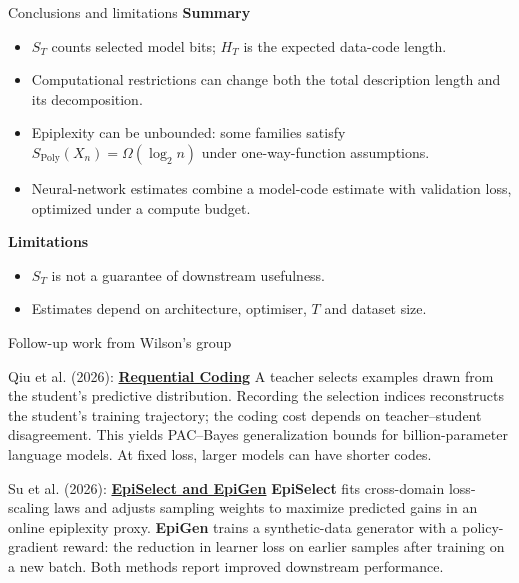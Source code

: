 \documentclass[aspectratio=169,notheorems]{beamer}
\theoremstyle{definition}
\newcommand{\Poly}{\mathrm{Poly}}
\begin{document}
\begin{frame}{Conclusions and limitations}
\textbf{Summary}
\begin{itemize}\setlength{\itemsep}{0.3em}
\item $S_T$ counts selected model bits; $H_T$ is the expected data-code length.
\item Computational restrictions can change both the total description length and its decomposition.
\item Epiplexity can be unbounded: some families satisfy $S_{\Poly}(X_n)=\Omega(\log_2 n)$ under one-way-function assumptions.
\item Neural-network estimates combine a model-code estimate with validation loss, optimized under a compute budget.
\end{itemize}
\medskip
\textbf{Limitations}
\begin{itemize}\setlength{\itemsep}{0.3em}
\item $S_T$ is not a guarantee of downstream usefulness.
\item Estimates depend on architecture, optimiser, $T$ and dataset size.
\end{itemize}
\end{frame}
\begin{frame}{Follow-up work from Wilson's group}
\small
\begin{block}{Qiu et al. (2026): \href{https://arxiv.org/abs/2607.11883}{\textbf{Requential Coding}}}
A teacher selects examples drawn from the student's predictive distribution. Recording the selection indices reconstructs the student's training trajectory; the coding cost depends on teacher--student disagreement. This yields PAC--Bayes generalization bounds for billion-parameter language models. At fixed loss, larger models can have shorter codes.
\end{block}
\begin{block}{Su et al. (2026): \href{https://arxiv.org/abs/2608.11746}{\textbf{EpiSelect and EpiGen}}}
\textbf{EpiSelect} fits cross-domain loss-scaling laws and adjusts sampling weights to maximize predicted gains in an online epiplexity proxy. \textbf{EpiGen} trains a synthetic-data generator with a policy-gradient reward: the reduction in learner loss on earlier samples after training on a new batch. Both methods report improved downstream performance.
\end{block}
\end{frame}
\end{document}
